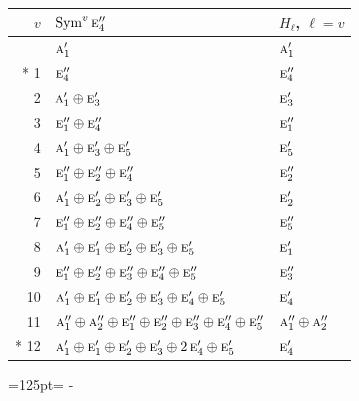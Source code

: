 \documentclass[10pt,a4paper]{article}
\newcommand{\needspace}[1]{\par\penalty-100\begingroup\dimen0=#1\relax\dimen2=\pagegoal
  \advance\dimen2-\pagetotal\ifdim\dimen0>\dimen2\relax\ifdim\dimen2>0pt\vfil\break\fi\fi
  \endgroup}
\numberwithin{equation}{section}
\newcommand{\irr}[1]{\text{\normalfont\scshape #1}}
\begin{document}
{\small\begin{longtable}{@{}rll@{}}\toprule
$v$ & $\operatorname{Sym}^{v}\irr{e}_{4}''$ & $H_\ell$, $\ell = v$\\\midrule\endhead
\bottomrule\endfoot\endlastfoot
0 & $\irr{a}_{1}'$ & $\irr{a}_{1}'$\\*
1 & $\irr{e}_{4}''$ & $\irr{e}_{4}''$\\
2 & $\irr{a}_{1}' \oplus \irr{e}_{3}'$ & $\irr{e}_{3}'$\\
3 & $\irr{e}_{1}'' \oplus \irr{e}_{4}''$ & $\irr{e}_{1}''$\\
4 & $\irr{a}_{1}' \oplus \irr{e}_{3}' \oplus \irr{e}_{5}'$ & $\irr{e}_{5}'$\\
5 & $\irr{e}_{1}'' \oplus \irr{e}_{2}'' \oplus \irr{e}_{4}''$ & $\irr{e}_{2}''$\\
6 & $\irr{a}_{1}' \oplus \irr{e}_{2}' \oplus \irr{e}_{3}' \oplus \irr{e}_{5}'$ & $\irr{e}_{2}'$\\
7 & $\irr{e}_{1}'' \oplus \irr{e}_{2}'' \oplus \irr{e}_{4}'' \oplus \irr{e}_{5}''$ & $\irr{e}_{5}''$\\
8 & $\irr{a}_{1}' \oplus \irr{e}_{1}' \oplus \irr{e}_{2}' \oplus \irr{e}_{3}' \oplus \irr{e}_{5}'$ & $\irr{e}_{1}'$\\
9 & $\irr{e}_{1}'' \oplus \irr{e}_{2}'' \oplus \irr{e}_{3}'' \oplus \irr{e}_{4}'' \oplus \irr{e}_{5}''$ & $\irr{e}_{3}''$\\
10 & $\irr{a}_{1}' \oplus \irr{e}_{1}' \oplus \irr{e}_{2}' \oplus \irr{e}_{3}' \oplus \irr{e}_{4}' \oplus \irr{e}_{5}'$ & $\irr{e}_{4}'$\\
11 & $\irr{a}_{1}'' \oplus \irr{a}_{2}'' \oplus \irr{e}_{1}'' \oplus \irr{e}_{2}'' \oplus \irr{e}_{3}'' \oplus \irr{e}_{4}'' \oplus \irr{e}_{5}''$ & $\irr{a}_{1}'' \oplus \irr{a}_{2}''$\\*
12 & $\irr{a}_{1}' \oplus \irr{e}_{1}' \oplus \irr{e}_{2}' \oplus \irr{e}_{3}' \oplus 2\,\irr{e}_{4}' \oplus \irr{e}_{5}'$ & $\irr{e}_{4}'$\\
\bottomrule\end{longtable}}
\needspace{125pt}
\end{document}
